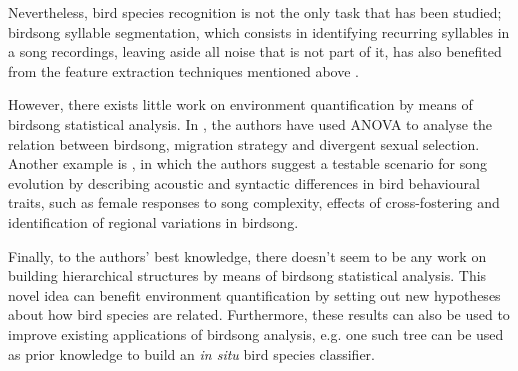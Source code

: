 \documentclass[pdftex,11pt,a4paper]{article}
\theoremstyle{definition}
\theoremstyle{remark}
\begin{document}
\par Nevertheless, bird species recognition is not the only task that has been studied; birdsong syllable segmentation, which consists in identifying recurring syllables in a song recordings, leaving aside all noise that is not part of it, has also benefited from the feature extraction techniques mentioned above \cite{Chou2008a}. 
\par However, there exists little work on environment quantification by means of birdsong statistical analysis. In \cite{Collins2009}, the authors have used ANOVA to analyse the relation between birdsong, migration strategy and divergent sexual selection. Another example is \cite{BolhuisJohanJ.andEveraertMartin2015}, in which the authors suggest a testable scenario for song evolution by describing acoustic and syntactic differences in bird behavioural traits, such as female responses to song complexity, effects of cross-fostering and identification of regional variations in birdsong.
\par Finally, to the authors' best knowledge, there doesn't seem to be any work on building hierarchical structures by means of birdsong statistical analysis. This novel idea can benefit environment quantification by setting out new hypotheses about how bird species are related. Furthermore, these results can also be used to improve existing applications of birdsong analysis, e.g. one such tree can be used as prior knowledge to build an \emph{in situ} bird species classifier.
\end{document}
